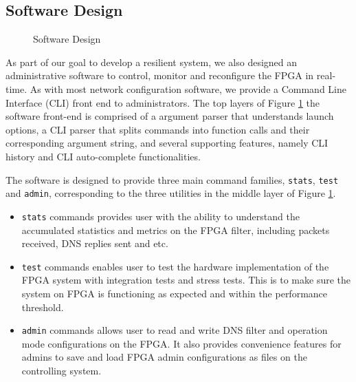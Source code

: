 \documentclass[a4paper]{report}
\newcommand{\code}{\texttt}
\begin{document}
\subsection{Software Design}

\begin{figure}[h!]
  \caption{Software Design}
  \label{fig:software-design}
\end{figure}

As part of our goal to develop a resilient system, we also designed an administrative software to control, monitor and reconfigure the FPGA in real-time. As with most network configuration software, we provide a Command Line Interface (CLI) front end to administrators. The top layers of Figure \ref{fig:software-design} the software front-end is comprised of a argument parser that understands launch options, a CLI parser that splits commands into function calls and their corresponding argument string, and several supporting features, namely CLI history and CLI auto-complete functionalities.

The software is designed to provide three main command families, \code{stats}, \code{test} and \code{admin}, corresponding to the three utilities in the middle layer of Figure \ref{fig:software-design}. 
\begin{itemize}
    \item \code{stats} commands provides user with the ability to understand the accumulated statistics and metrics on the FPGA filter, including packets received, DNS replies sent and etc.
    \item \code{test} commands enables user to test the hardware implementation of the FPGA system with integration tests and stress tests. This is to make sure the system on FPGA is functioning as expected and within the performance threshold.
    \item \code{admin} commands allows user to read and write DNS filter and operation mode configurations on the FPGA. It also provides convenience features for admins to save and load FPGA admin configurations as files on the controlling system.
\end{itemize}
\end{document}
